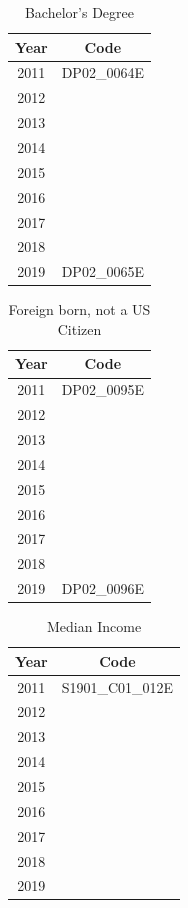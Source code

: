 \documentclass[conference]{IEEEtran}
\begin{document}
\clearpage
{}\label{app_A}
\begin{table}[htbp]
\caption{Bachelor's Degree}
\begin{center}
\begin{tabular}{cc}
\hline\hline
\textbf{Year} & \textbf{Code} \\
\hline
2011 & DP02\_0064E \\
2012 &  \\
2013 &  \\
2014 &  \\
2015 &  \\
2016 &  \\
2017 &  \\
2018 &  \\
\hline
2019 & DP02\_0065E \\
\hline\hline
\end{tabular}
\end{center}
\end{table}
\begin{table}[htbp]
\caption{Foreign born, not a US Citizen}
\begin{center}
\begin{tabular}{cc}
\hline\hline
\textbf{Year} & \textbf{Code} \\
\hline
2011 & DP02\_0095E \\
2012 & \\
2013 & \\
2014 & \\
2015 & \\
2016 & \\
2017 & \\
2018 & \\
\hline
2019 & DP02\_0096E \\
\hline\hline
\end{tabular}
\end{center}
\end{table}
\begin{table}[htbp]
\caption{Median Income}
\begin{center}
\begin{tabular}{cc}
\hline\hline
\textbf{Year} & \textbf{Code} \\
\hline
2011 & S1901\_C01\_012E \\
2012 & \\
2013 & \\
2014 & \\
2015 & \\
2016 & \\
2017 & \\
2018 & \\
2019 & \\
\hline\hline
\end{tabular}
\end{center}
\end{table}
\end{document}
